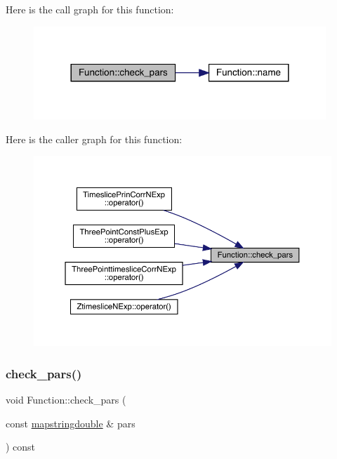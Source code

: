 Here is the call graph for this function\+:
\nopagebreak
\begin{figure}[H]
\begin{center}
\leavevmode
\includegraphics[width=312pt]{de/d65/classFunction_a6f2286114002e574154727a813957175_cgraph}
\end{center}
\end{figure}
Here is the caller graph for this function\+:
\nopagebreak
\begin{figure}[H]
\begin{center}
\leavevmode
\includegraphics[width=350pt]{de/d65/classFunction_a6f2286114002e574154727a813957175_icgraph}
\end{center}
\end{figure}
\mbox{\label{classFunction_a6f2286114002e574154727a813957175}} 
\subsubsection{\texorpdfstring{check\_pars()}{check\_pars()}\hspace{0.1cm}{\footnotesize\ttfamily [2/2]}}
{\footnotesize\ttfamily void Function\+::check\+\_\+pars (\begin{DoxyParamCaption}\item[{const \mbox{\hyperlink{lib_2fitting__lib_2includes_8h_a647b481c557c7966517f753340a81d13}{mapstringdouble}} \&}]{pars }\end{DoxyParamCaption}) const\hspace{0.3cm}{\ttfamily [inline]}}

